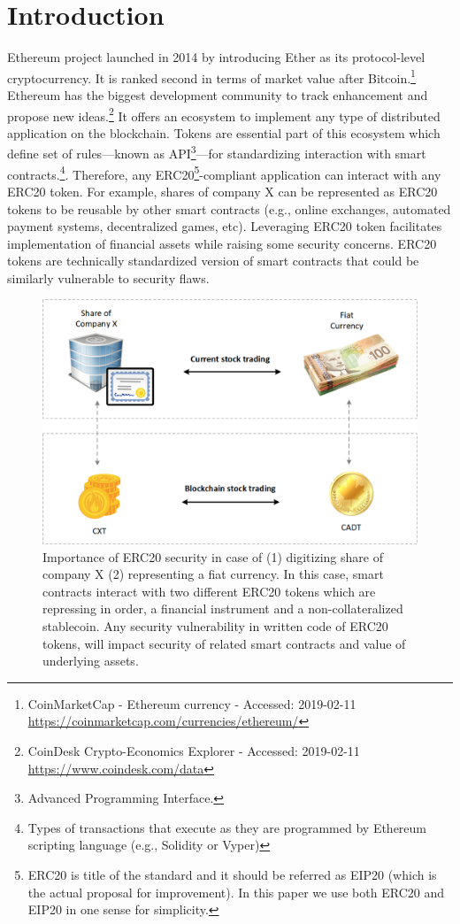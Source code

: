 
\section{Introduction}
Ethereum project\cite{Ref00} launched in 2014 by introducing Ether as its protocol-level cryptocurrency. It is ranked second in terms of market value after Bitcoin.\footnote{CoinMarketCap - Ethereum currency - Accessed: 2019-02-11 \newline\url{https://coinmarketcap.com/currencies/ethereum/}} Ethereum has the biggest development community to track enhancement and propose new ideas.\footnote{CoinDesk Crypto-Economics Explorer - Accessed: 2019-02-11 \newline\url{https://www.coindesk.com/data}} It offers an ecosystem to implement any type of distributed application on the blockchain. Tokens are essential part of this ecosystem which define set of rules---known as API\footnote{Advanced Programming Interface.}---for standardizing interaction with smart contracts.\footnote{Types of transactions that execute as they are programmed by Ethereum scripting language (e.g., Solidity or Vyper)}. Therefore, any ERC20\footnote{ERC20 is title of the standard and it should be referred as EIP20 (which is the actual proposal for improvement). In this paper we use both ERC20 and EIP20 in one sense for simplicity.}-compliant application can interact with any ERC20 token. For example, shares of company X can be represented as ERC20 tokens to be reusable by other smart contracts (e.g., online exchanges, automated payment systems, decentralized games, etc). Leveraging ERC20 token facilitates implementation of financial assets while raising some security concerns. ERC20 tokens are technically standardized version of smart contracts that could be similarly vulnerable to security flaws.
\begin{figure}[t]
	\centering
	\includegraphics[width=1.0\linewidth]{figures/multiple_withdrawal_01.png}
	\caption{Importance of ERC20 security in case of (1) digitizing share of company X (2) representing a fiat currency. In this case, smart contracts interact with two different ERC20 tokens which are repressing in order, a financial instrument and a non-collateralized stablecoin. Any security vulnerability in written code of ERC20 tokens, will impact security of related smart contracts and value of underlying assets.}
\end{figure}

